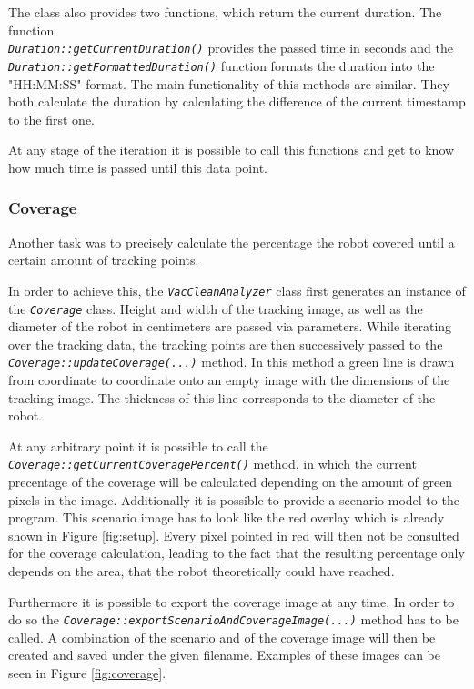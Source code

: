 \documentclass[twoside]{article}
\begin{document}
The class also provides two functions, which return the current duration. The function \\ \textit{\texttt{Duration::getCurrentDuration()}} provides the passed time in seconds and the \\ \textit{\texttt{Duration::getFormattedDuration()}} function formats the duration into the "HH:MM:SS" format. The main functionality of this methods are similar. They both calculate the duration by calculating the difference of the current timestamp to the first one. 

At any stage of the iteration it is possible to call this functions and get to know how much time is passed until this data point.

\subsubsection{Coverage} %

Another task was to precisely calculate the percentage the robot covered until a certain amount of tracking points.

In order to achieve this, the \textit{\texttt{VacCleanAnalyzer}} class first generates an instance of the \textit{\texttt{Coverage}} class.
Height and width of the tracking image, as well as the diameter of the robot in centimeters are passed via parameters.
While iterating over the tracking data, the tracking points are then successively passed to the \textit{\texttt{Coverage::updateCoverage(...)}} method.
In this method a green line is drawn from coordinate to coordinate onto an empty image with the dimensions of the tracking image.
The thickness of this line corresponds to the diameter of the robot.

At any arbitrary point it is possible to call the \textit{\texttt{Coverage::getCurrentCoveragePercent()}} method, in which the current precentage of the coverage will be calculated depending on the amount of green pixels in the image.
Additionally it is possible to provide a scenario model to the program.
This scenario image has to look like the red overlay which is already shown in Figure \ref{fig:setup}.
Every pixel pointed in red will then not be consulted for the coverage calculation, leading to the fact that the resulting percentage only depends on the area, that the robot theoretically could have reached.

Furthermore it is possible to export the coverage image at any time.
In order to do so the \textit{\texttt{Coverage::exportScenarioAndCoverageImage(...)}} method has to be called.
A combination of the scenario and of the coverage image will then be created and saved under the given filename.
Examples of these images can be seen in Figure \ref{fig:coverage}.
\end{document}
